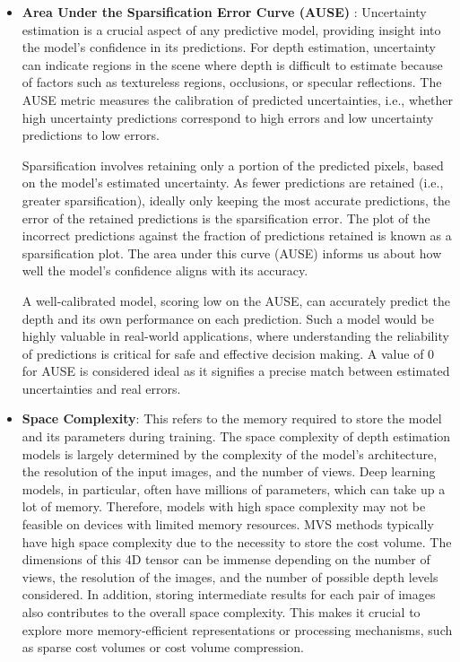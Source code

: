 \begin{itemize}
    \item \textbf{Area Under the Sparsification Error Curve (AUSE)} \cite{Ilg2018}:  Uncertainty estimation is a crucial aspect of any predictive model, providing insight into the model's confidence in its predictions. For depth estimation, uncertainty can indicate regions in the scene where depth is difficult to estimate because of factors such as textureless regions, occlusions, or specular reflections. The AUSE metric measures the calibration of predicted uncertainties, i.e., whether high uncertainty predictions correspond to high errors and low uncertainty predictions to low errors.\par
    Sparsification involves retaining only a portion of the predicted pixels, based on the model's estimated uncertainty. As fewer predictions are retained (i.e., greater sparsification), ideally only keeping the most accurate predictions, the error of the retained predictions is the sparsification error. The plot of the incorrect predictions against the fraction of predictions retained is known as a sparsification plot. The area under this curve (AUSE) informs us about how well the model's confidence aligns with its accuracy.\par
    A well-calibrated model, scoring low on the AUSE, can accurately predict the depth and its own performance on each prediction. Such a model would be highly valuable in real-world applications, where understanding the reliability of predictions is critical for safe and effective decision making. A value of 0 for AUSE is considered ideal as it signifies a precise match between estimated uncertainties and real errors.
    \item \textbf{Space Complexity}: This refers to the memory required to store the model and its parameters during training. The space complexity of depth estimation models is largely determined by the complexity of the model's architecture, the resolution of the input images, and the number of views. Deep learning models, in particular, often have millions of parameters, which can take up a lot of memory. Therefore, models with high space complexity may not be feasible on devices with limited memory resources. MVS methods typically have high space complexity due to the necessity to store the cost volume. The dimensions of this 4D tensor can be immense depending on the number of views, the resolution of the images, and the number of possible depth levels considered. In addition, storing intermediate results for each pair of images also contributes to the overall space complexity. This makes it crucial to explore more memory-efficient representations or processing mechanisms, such as sparse cost volumes or cost volume compression.

\end{itemize}
